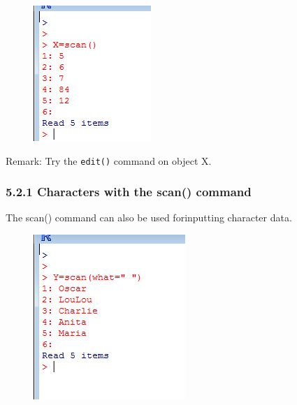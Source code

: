 \documentclass{beamer}
\begin{document}
 	\begin{frame}
 		\begin{figure}
 			\centering
 			\includegraphics[width=0.8\linewidth]{images/scannumbers}
 		\end{figure}
 		
 		Remark: Try the \texttt{edit()} command on object X.
 	\end{frame}
 	\begin{frame}
 		\frametitle{5.2.1 Characters with the scan() command}
 		The scan() command can also be used forinputting character data.
 		\begin{figure}
 			\centering
 			\includegraphics[width=0.7\linewidth]{images/scandognames}
 		\end{figure}
 		
 	\end{frame}
\end{document}
